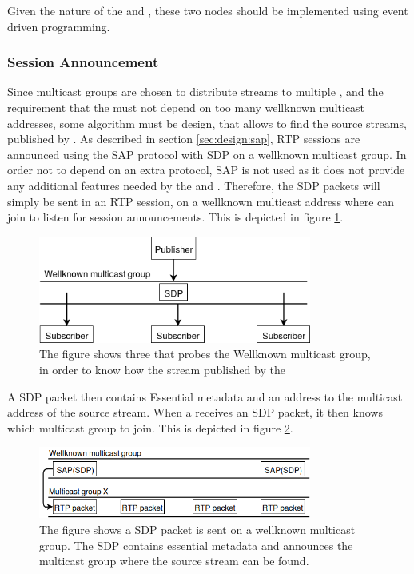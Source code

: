 Given the nature of the \pubs{} and \subs{}, these two nodes should be implemented using event driven programming.


\subsubsection{Session Announcement} \label{sec:design:sessionannouncement}
Since multicast groups are chosen to distribute streams to multiple \subs, and the requirement that the \sub{} must not depend on too many wellknown multicast addresses, some algorithm must be design, that allows \subs{} to find the source streams, published by \pubs. As described in section \ref{sec:design:sap}, RTP sessions are announced using the SAP protocol with SDP on a wellknown multicast group. In order not to depend on an extra protocol, SAP is not used as it does not provide any additional features needed by the \pubs{} and \subs{}. Therefore, the SDP packets will simply be sent in an RTP session, on a wellknown multicast address where \subs{} can join to listen for session announcements. This is depicted in figure \ref{fig:design:pubsub:session_probe}.

\begin{figure}[H]
	\centering
	\includegraphics[width=0.8\textwidth]{figures/session-announcement-probe}
	\caption{The figure shows three \subs{} that probes the Wellknown multicast group, in order to know how the stream published by the \pub{}} \label{fig:design:pubsub:session_probe}
\end{figure}

A SDP packet then contains Essential metadata and an address to the multicast address of the source stream. When a \subs{} receives an SDP packet, it then knows which multicast group to join. This is depicted in figure \ref{fig:design:sessionannouncement}.

\begin{figure}[H]
	\centering
	\includegraphics[width=0.8\textwidth]{figures/sap-figure}
	 \caption{The figure shows a SDP packet is sent on a wellknown multicast group. The SDP contains essential metadata and announces the multicast group where the source stream can be found.}\label{fig:design:sessionannouncement}
\end{figure}


